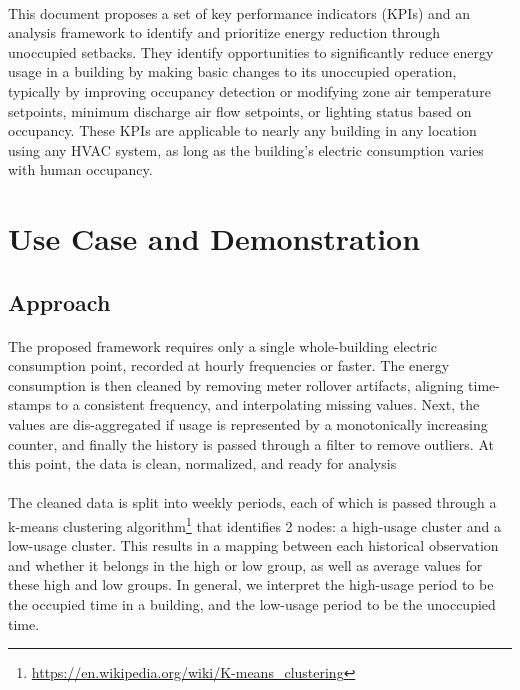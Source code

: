 \documentclass[a4paper]{article}
\begin{document}
\paragraph{}
This document proposes a set of key performance indicators (KPIs) and an analysis framework to identify and prioritize energy reduction through unoccupied setbacks. They identify opportunities to significantly reduce energy usage in a building by making basic changes to its unoccupied operation, typically by improving occupancy detection or modifying zone air temperature setpoints, minimum discharge air flow setpoints, or lighting status based on occupancy. These KPIs are applicable to nearly any building in any location using any HVAC system, as long as the building's electric consumption varies with human occupancy.

\section{Use Case and Demonstration}

\subsection{Approach}

\paragraph{}
The proposed framework requires only a single whole-building electric consumption point, recorded at hourly frequencies or faster. The energy consumption is then cleaned by removing meter rollover artifacts, aligning time-stamps to a consistent frequency, and interpolating missing values. Next, the values are dis-aggregated if usage is represented by a monotonically increasing counter, and finally the history is passed through a filter to remove outliers. At this point, the data is clean, normalized, and ready for analysis

\paragraph{}
The cleaned data is split into weekly periods, each of which is passed through a k-means clustering algorithm\footnote{\url{https://en.wikipedia.org/wiki/K-means\_clustering}} that identifies 2 nodes: a high-usage cluster and a low-usage cluster. This results in a mapping between each historical observation and whether it belongs in the high or low group, as well as average values for these high and low groups. In general, we interpret the high-usage period to be the occupied time in a building, and the low-usage period to be the unoccupied time.
\end{document}
